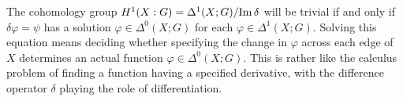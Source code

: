 The cohomology group \(H^1(X:G)=\Delta^1(X;G)/{\operatorname{Im}\delta}\) will be
trivial if and only if \(\delta\varphi=\psi\) has a solution
\(\varphi\in\Delta^0(X;G)\) for each \(\varphi\in\Delta^1(X;G)\). Solving
this equation means deciding whether specifying the change in \(\varphi\)
across each edge of \(X\) determines an actual function
\(\varphi\in\Delta^0(X;G)\). This is rather like the calculus problem of
finding a function having a specified derivative, with the difference
operator \(\delta\) playing the role of differentiation.

